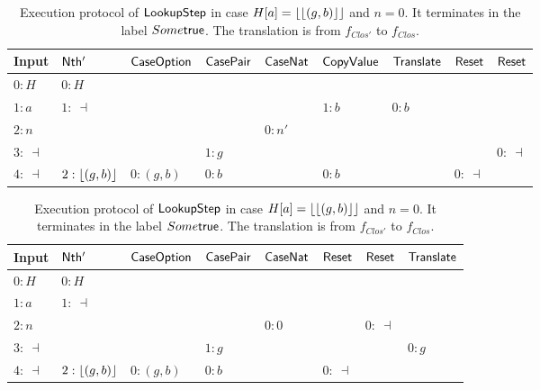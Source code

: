 \begin{table}[H]
  \scriptsize
  \begin{tabular}{l||l|l|l|l|l|l|l|l}
    Input       & $\mathsf{Nth'}$      & $\mathsf{CaseOption}$       & $\mathsf{CasePair}$     & $\mathsf{CaseNat}$ & $\mathsf{CopyValue}$  & $\mathsf{Translate}$ & $\mathsf{Reset}$ & $\mathsf{Reset}$ \\ \hline
    $0:H$       & $0:H$            &                       &                      &                 &                   &                  &              &              \\
    $1:a$       & $1:~\dashv$      &                       &                      &                 & $1:b$             & $0:b$            &              &              \\
    $2:n$       &                  &                       &                      & $0:n'$          &                   &                  &              &              \\
    $3:~\dashv$ &                  &                       & $1: g$               &                 &                   &                  &              & $0:~\dashv$  \\
    $4:~\dashv$ & $2:\left\lfloor {(g,b)} \right\rfloor$ & $0:(g,b)$             & $0:b$                &                 & $0:b$             &                  & $0:~\dashv$  &              \\
  \end{tabular}
  \caption{Execution protocol of $\mathsf{LookupStep}$ in case $H[a] = \left\lfloor {\left\lfloor {(g,b)} \right\rfloor} \right\rfloor$ and $n=S~n'$.  It terminates in the label $\None$.  The
    translation is from $f_{next}$ to $f_{add}$.}
  \label{tab:exec-LookupStep-S}
  \begin{tabular}{l||l|l|l|l|l|l|l}
    Input       & $\mathsf{Nth'}$      & $\mathsf{CaseOption}$       & $\mathsf{CasePair}$     & $\mathsf{CaseNat}$ & $\mathsf{Reset}$ & $\mathsf{Reset}$ & $\mathsf{Translate}$ \\ \hline
    $0:H$       & $0:H$            &                       &                      &                 &              &              &                  \\
    $1:a$       & $1:~\dashv$      &                       &                      &                 &              &              &                  \\
    $2:n$       &                  &                       &                      & $0:0$           &              & $0:~\dashv$  &                  \\
    $3:~\dashv$ &                  &                       & $1: g$               &                 &              &              & $0:g$            \\
    $4:~\dashv$ & $2:\left\lfloor {(g,b)} \right\rfloor$ & $0:(g,b)$             & $0:b$                &                 & $0:~\dashv$  &              &                  \\
  \end{tabular}
  \caption{Execution protocol of $\mathsf{LookupStep}$ in case $H[a] = \left\lfloor {\left\lfloor {(g,b)} \right\rfloor} \right\rfloor$ and $n=0$.  It terminates in the label $Some\mathsf{true}$.  The
    translation is from $f_{Clos'}$ to $f_{Clos}$.}
  \label{tab:exec-LookupStep-0}
\end{table}

